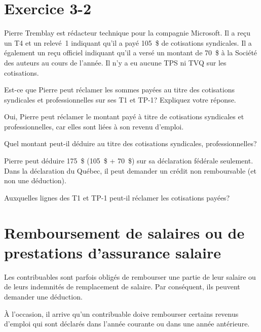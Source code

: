 


\section{Exercice 3-2}
\setcounter{question}{0}
\begin{question}
	Pierre Tremblay est rédacteur technique pour la compagnie Microsoft. Il a reçu un T4 et un relevé~1 indiquant qu'il a payé 105~\$ de cotisations syndicales. Il a également un reçu officiel indiquant qu'il a versé un montant de 70~\$ à la Société des auteurs au cours de l'année. Il n'y a eu aucune TPS ni TVQ sur les cotisations.
\end{question}

\setcounter{sousQuestion}{0}
\begin{sousQuestion}
	Est-ce que Pierre peut réclamer les sommes payées au titre des cotisations syndicales et professionnelles sur ses T1 et TP-1? Expliquez votre réponse.
\end{sousQuestion}
Oui, Pierre peut réclamer le montant payé à titre de cotisations syndicales et professionnelles, car elles sont liées à son revenu d'emploi.

\begin{sousQuestion}
	Quel montant peut-il déduire au titre des cotisations syndicales, professionnelles? 
\end{sousQuestion}
Pierre peut déduire 175~\$ (105~\$ + 70~\$) sur sa déclaration fédérale seulement. Dans la déclaration du Québec, il peut demander un crédit non remboursable (et non une déduction).

\begin{sousQuestion}
	Auxquelles lignes des T1 et TP-1 peut-il réclamer les cotisations payées?
\end{sousQuestion}



\section{Remboursement de salaires ou de prestations d'assurance salaire}
\begin{intro}
	Les contribuables sont parfois obligés de rembourser une partie de leur salaire ou de leurs indemnités de remplacement de salaire. Par conséquent, ils peuvent demander une déduction.
\end{intro}

À l'occasion, il arrive qu'un contribuable doive rembourser certains revenus d'emploi qui sont déclarés dans l'année courante ou dans une année antérieure. 

